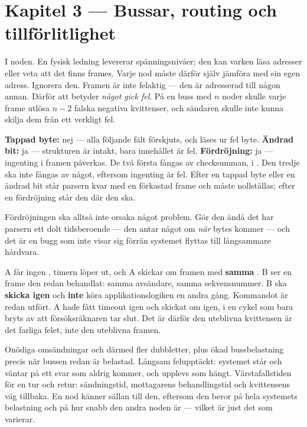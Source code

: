 \section*{Kapitel 3 --- Bussar, routing och tillförlitlighet}

 I noden. En fysisk ledning levererar spänningsnivåer; den kan varken läsa adresser eller
veta att det finns frames. Varje nod måste därför själv jämföra  med sin egen adress.
 Ignorera den. Framen är inte felaktig --- den är adresserad till någon annan.
 Därför att  betyder \emph{något gick fel}. På en buss med $n$ noder skulle varje
frame utlösa $n-2$ falska negativa kvittenser, och sändaren skulle inte kunna skilja dem från ett
verkligt fel.

 \textbf{Tappad byte:} nej --- alla följande fält förskjuts, och  läses ur fel
byte. \textbf{Ändrad bit:} ja --- strukturen är intakt, bara innehållet är fel.
\textbf{Fördröjning:} ja --- ingenting i framen påverkas.
 De två första fångas av checksumman, i . Den tredje ska inte fångas
av något, eftersom ingenting är fel.
 Efter en tappad byte eller en ändrad bit står parsern kvar med en förkastad frame och
måste nollställas; efter en fördröjning står den där den ska.

Fördröjningen ska alltså inte orsaka något problem. Gör den ändå det har parsern ett dolt
tidsberoende --- den antar något om \emph{när} bytes kommer --- och det är en bugg som inte visar
sig förrän systemet flyttas till långsammare hårdvara.

 A får ingen , timern löper ut, och A skickar om framen med \textbf{samma}
.
 B ser en frame den redan behandlat: samma avsändare, samma sekvensnummer.
 B ska \textbf{skicka  igen} och \textbf{inte} köra applikationslogiken en andra
gång. Kommandot är redan utfört.
 A hade fått timeout igen och skickat om igen, i en cykel som bara bryts av att
försöksräknaren tar slut. Det är därför den uteblivna kvittensen är det farliga felet, inte den
uteblivna framen.

 Onödiga omsändningar och därmed fler dubbletter, plus ökad bussbelastning precis när
bussen redan är belastad.
 Långsam felupptäckt: systemet står och väntar på ett svar som aldrig kommer, och
upplevs som hängt.
 Värstafallstiden för en tur och retur: sändningstid, mottagarens behandlingstid och
kvittensens väg tillbaka. En nod känner sällan till den, eftersom den beror på hela systemets
belastning och på hur snabb den andra noden är --- vilket är just det som varierar.

